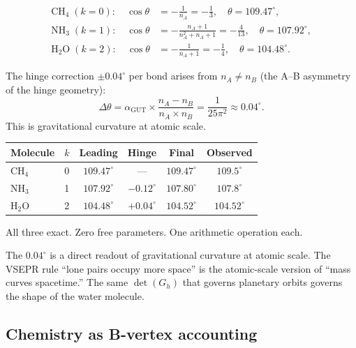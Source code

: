 \begin{theorem}
\begin{align}
\text{CH}_4 \;(k=0): \quad \cos\theta &= -\frac{1}{n_A} = -\frac{1}{3}, \quad \theta = 109.47^\circ, \\[4pt]
\text{NH}_3 \;(k=1): \quad \cos\theta &= -\frac{n_A + 1}{n_A^2 + n_A + 1} = -\frac{4}{13}, \quad \theta = 107.92^\circ, \\[4pt]
\text{H}_2\text{O} \;(k=2): \quad \cos\theta &= -\frac{1}{n_A + 1} = -\frac{1}{4}, \quad \theta = 104.48^\circ.
\end{align}
\end{theorem}

The hinge correction $\pm 0.04^\circ$ per bond arises from $n_A \neq n_B$ (the A--B asymmetry of the hinge geometry):
\begin{equation}
\Delta\theta = \alpha_\text{GUT} \times \frac{n_A - n_B}{n_A \times n_B} = \frac{1}{25\pi^2} \approx 0.04^\circ.
\end{equation}
This is gravitational curvature at atomic scale.

\begin{center}
\begin{tabular}{lccccc}
\hline
Molecule & $k$ & Leading & Hinge & Final & Observed \\
\hline
CH$_4$ & 0 & $109.47^\circ$ & --- & $109.47^\circ$ & $109.5^\circ$ \\
NH$_3$ & 1 & $107.92^\circ$ & $-0.12^\circ$ & $107.80^\circ$ & $107.8^\circ$ \\
H$_2$O & 2 & $104.48^\circ$ & $+0.04^\circ$ & $104.52^\circ$ & $104.52^\circ$ \\
\hline
\end{tabular}
\end{center}

All three exact. Zero free parameters. One arithmetic operation each.

\begin{remark}
The $0.04^\circ$ is a direct readout of gravitational curvature at atomic scale. The VSEPR rule ``lone pairs occupy more space'' is the atomic-scale version of ``mass curves spacetime.'' The same $\det(G_h)$ that governs planetary orbits governs the shape of the water molecule.
\end{remark}

\subsection{Chemistry as B-vertex accounting}

